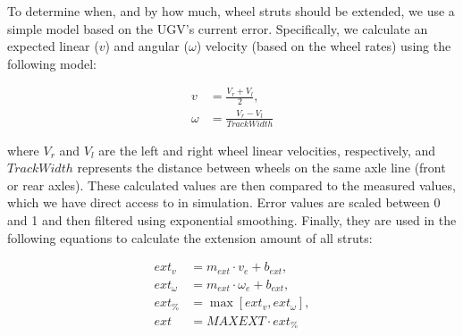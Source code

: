 To determine when, and by how much, wheel struts should be extended, we use a simple model based on the UGV's current error. Specifically, we calculate an expected linear ($v$) and angular ($\omega$) velocity (based on the wheel rates) using the following model:

%

\vspace{-0.12in}

\begin{align}
  v &= \frac{V_r + V_l}{2},\\
  \omega &= \frac{V_r - V_l}{\mathit{TrackWidth}}
\end{align}

\noindent
where $V_r$ and $V_l$ are the left and right wheel linear velocities,
respectively, and $\mathit{TrackWidth}$ represents the distance between wheels on the same axle line (front or rear axles).
%
%
%
These calculated values are then compared to the measured values, which we have direct access to in simulation.
%
Error values are scaled between 0 and 1 and then filtered using exponential smoothing. Finally, they are used in the following equations to calculate the extension amount of all struts:

\vspace{-0.2in}

\begin{align}
    \mathit{ext}_v &= m_{\mathit{ext}} \cdot v_e + b_{\mathit{ext}},\\
    \mathit{ext}_\omega &= m_{\mathit{ext}} \cdot \omega_e + b_{\mathit{ext}},\\
    \mathit{ext}_\% &= \max[\mathit{ext}_v, \mathit{ext}_\omega],\\
    \mathit{ext} &= \mathit{MAXEXT} \cdot \mathit{ext}_\%
\end{align}

